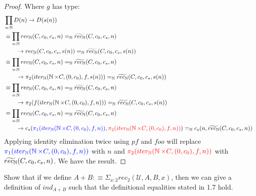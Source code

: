 \documentclass{article}
\begin{document}
\begin{proof}
  Where $g$ has type:
  \begin{align*}
    & \prod_{n : \N} D(n) \to D(s(n))\\
    & \equiv \prod_{n : \N} rec_{\N}(C, c_0, c_s, n) =_{\N} \widetilde{rec_{\N}}(C, c_0, c_s, n)\\
      & \qquad \to rec_{\N}(C, c_0, c_s, s(n)) =_{\N} \widetilde{rec_{\N}}(C, c_0, c_s, s(n))\\
    & \equiv \prod_{n : \N} rec_{\N}(C, c_0, c_s, n) =_{\N} \widetilde{rec_{\N}}(C, c_0, c_s, n)\\
      & \qquad \to \pi_2(iter_{\N}(\N \times C, (0, c_0), f, s(n))) =_{\N} \widetilde{rec_{\N}}(C, c_0, c_s, s(n))\\
    & \equiv \prod_{n : \N} rec_{\N}(C, c_0, c_s, n) =_{\N} \widetilde{rec_{\N}}(C, c_0, c_s, n)\\
      & \qquad \to \pi_2(f(iter_{\N}(\N \times C, (0, c_0), f, n))) =_{\N} \widetilde{rec_{\N}}(C, c_0, c_s, s(n))\\
    & \equiv \prod_{n : \N} rec_{\N}(C, c_0, c_s, n) =_{\N} \widetilde{rec_{\N}}(C, c_0, c_s, n)\\
    & \qquad \to c_s( \textcolor{blue}{\pi_1(iter_{\N}(\N \times C, (0, c_0), f, n))},
      \textcolor{red}{\pi_2(iter_{\N}(\N \times C, (0, c_0), f, n))})
      =_{\N} c_s(n, \widetilde{rec_{\N}}(C, c_0, c_s, n))
  \end{align*}
  Applying identity elimination twice using $pf$ and $foo$ will replace
  $\color{blue}\pi_1(iter_{\N}(\N \times C, (0, c_0), f, n))$ with $n$ and
  $\color{red}\pi_2(iter_{\N}(\N \times C, (0, c_0), f, n))$ with $\widetilde{rec_{\N}}(C,
  c_0, c_s, n)$. We have the result.
\end{proof}


\begin{xprob}{1.5}
  Show that if we define $A + B :\equiv \Sigma_{x : 2} rec_2(\mathcal{U}, A, B,
  x)$, then we can give a definition of $ind_{A + B}$ such that the definitional
  equalities stated in 1.7 hold.
\end{xprob}
\end{document}

